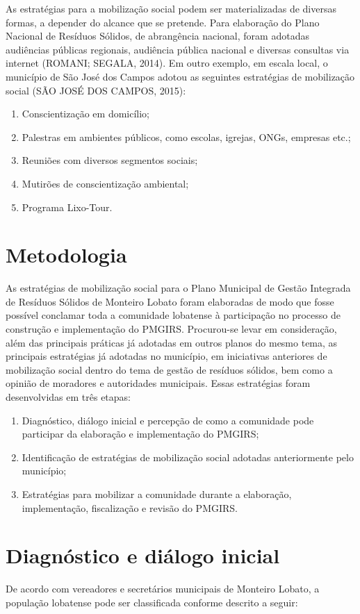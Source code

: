 As estratégias para a mobilização social podem ser materializadas de diversas formas, a depender do alcance que se pretende. Para elaboração do Plano Nacional de Resíduos Sólidos, de abrangência nacional, foram adotadas audiências públicas regionais, audiência pública nacional e diversas consultas via internet (ROMANI; SEGALA, 2014). Em outro exemplo, em escala local, o município de São José dos Campos adotou as seguintes estratégias de mobilização social (SÃO JOSÉ DOS CAMPOS, 2015):
\begin{enumerate}
	\item Conscientização em domicílio;
	\item Palestras em ambientes públicos, como escolas, igrejas, ONGs, empresas etc.;
	\item Reuniões com diversos segmentos sociais;
	\item Mutirões de conscientização ambiental;
	\item Programa Lixo-Tour.
\end{enumerate}

\section{Metodologia}

As estratégias de mobilização social para o Plano Municipal de Gestão Integrada de Resíduos Sólidos de Monteiro Lobato foram elaboradas de modo que fosse possível conclamar toda a comunidade lobatense à participação no processo de construção e implementação do PMGIRS. Procurou-se levar em consideração, além das principais práticas já adotadas em outros planos do mesmo tema, as principais estratégias já adotadas no município, em iniciativas anteriores de mobilização social dentro do tema de gestão de resíduos sólidos, bem como a opinião de moradores e autoridades municipais. Essas estratégias foram desenvolvidas em três etapas:
\begin{enumerate}
	\item Diagnóstico, diálogo inicial e percepção de como a comunidade pode participar da elaboração e implementação do PMGIRS;
	\item Identificação de estratégias de mobilização social adotadas anteriormente pelo município;
	\item Estratégias para mobilizar a comunidade durante a elaboração, implementação, fiscalização e revisão do PMGIRS.
\end{enumerate}

\section{Diagnóstico e diálogo inicial}
 De acordo com vereadores e secretários municipais de Monteiro Lobato, a população lobatense pode ser classificada conforme descrito a seguir: 
 
